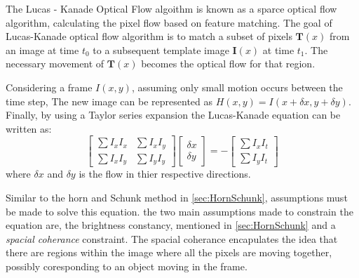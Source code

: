 \documentclass{UoNMCHA}
\numberwithin{equation}{section}
\begin{document}
The Lucas - Kanade Optical Flow algoithm is known as a sparce optical flow algorithm, calculating the pixel flow based on feature matching. The goal of Lucas-Kanade optical flow algorithm is to match a subset of pixels $\mathbf{T}(x)$ from an image at time $t_0$ to a subsequent template image $\mathbf{I}(x)$ at time $t_1$. The necessary movement of $\mathbf{T}(x)$ becomes the optical flow for that region. 

Considering a frame $I(x, y)$, assuming only small motion occurs between the time step, The new image can be represented as $H(x, y) = I(x + \delta x, y + \delta y)$. Finally, by using a Taylor series expansion the Lucas-Kanade equation can be written as:
\begin{equation}
	\begin{bmatrix}
		\sum{I_{x}I_{x}} & \sum{I_{x}I_{y}} \\
		\sum{I_{x}I_{y}} & \sum{I_{y}I_{y}}
	\end{bmatrix}
	\begin{bmatrix}
		\delta x \\
		\delta y
	\end{bmatrix} = -
	\begin{bmatrix}
		\sum{I_{x}I_{t}}\\
		\sum{I_{y}I_{t}}
	\end{bmatrix}
\end{equation}
where $\delta x$ and $\delta y$ is the flow in thier respective directions.

Similar to the horn and Schunk method in \cref{sec:HornSchunk}, assumptions must be made to solve this equation. the two main assumptions made to constrain the equation are, the brightness constancy, mentioned in \cref{sec:HornSchunk} and a \textit{spacial coherance} constraint. The spacial coherance encapulates the idea that there are regions within the image where all the pixels are moving together, possibly coresponding to an object moving in the frame.
\end{document}
